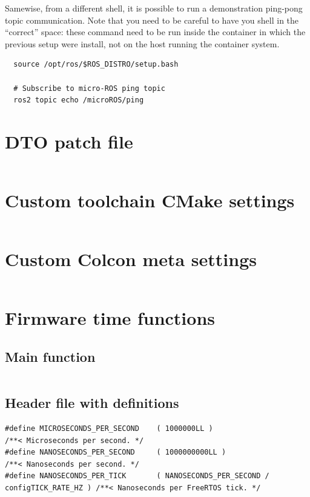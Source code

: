 \documentclass[10pt]{article}
\begin{document}
Samewise, from a different shell, it is possible to run a demonstration ping-pong topic communication.
Note that you need to be careful to have you shell in the ``correct'' space: these command need to be run inside
the container in which the previous setup were install, not on the host running the container system.
\begin{tcolorbox}
\begin{verbatim}
  source /opt/ros/$ROS_DISTRO/setup.bash
  
  # Subscribe to micro-ROS ping topic
  ros2 topic echo /microROS/ping
\end{verbatim}
\end{tcolorbox}

\pagebreak
\appendix
\section{DTO patch file}
\label{sec:DTO patch file}
\inputminted[linenos]{diff}{./src/system.patch}

\pagebreak
\section{Custom toolchain CMake settings}
\label{sec:toolchainsettings}
\inputminted[linenos]{cmake}{./src/custom_r5f_toolchain.cmake}

\pagebreak
\section{Custom Colcon meta settings}
\label{sec:colconsettings}
\inputminted[linenos]{yaml}{./src/custom_r5f_colcon.meta}

\pagebreak
\section{Firmware time functions}
\label{sec:timefunctions}

\subsection{Main function}
\inputminted[linenos]{c}{./src/clock.c}

\subsection{Header file with definitions}
\begin{verbatim}
#define MICROSECONDS_PER_SECOND    ( 1000000LL )                                   /**< Microseconds per second. */
#define NANOSECONDS_PER_SECOND     ( 1000000000LL )                                /**< Nanoseconds per second. */
#define NANOSECONDS_PER_TICK       ( NANOSECONDS_PER_SECOND / configTICK_RATE_HZ ) /**< Nanoseconds per FreeRTOS tick. */  
\end{verbatim}
\end{document}
